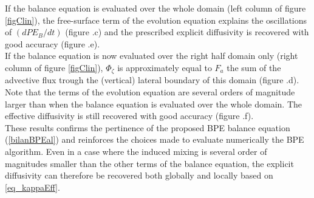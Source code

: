If the balance equation is evaluated over the whole domain (left column of figure \ref{figClin}), the free-surface term of the evolution equation explains the oscillations of $(dPE_B/dt)$ (figure .c) and the prescribed explicit diffusivity is recovered with good accuracy (figure .e).\\
If the balance equation is now evaluated over the right half domain only (right column of figure \ref{figClin}), $\Phi_{\zeta}$ is approximately equal to $F_a$ the sum of the advective flux trough the (vertical) lateral boundary of this domain (figure .d). Note that the terms of the evolution equation are several orders of magnitude larger than when the balance equation is evaluated over the whole domain. The effective diffusivity is still recovered with good accuracy (figure .f).\\
These results confirms the pertinence of the proposed BPE balance equation (\ref{bilanBPEal}) and reinforces the choices made to evaluate numerically the BPE algorithm. Even in a case where the induced mixing is several order of magnitudes smaller than the other terms of the balance equation, the explicit diffusivity can therefore be recovered both globally and locally based on \ref{eq_kappaEff}.


